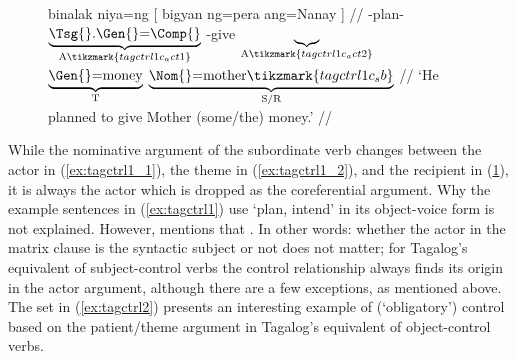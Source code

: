 \begin{figure}
\a\label{ex:tagctrl1_3}\begingl[aboveglbskip=1.5em, aboveglftskip=1.75em]
	\gla binalak niya=ng \textup{[} bigyan {} ng=pera ang=Nanay \textup{]} //
	\glb \Pfv{}-plan-\Ov{}
		$\underbrace{\text{\smash{\Tsg{}}.\Gen{}=\Comp{}}}_{\text{A}%
			\tikzmark{tagctrl1c_act1}%
		}$
		{}
		\Dv{}-give%
		$\underbrace{}_{\text{A}%
			\tikzmark{tagctrl1c_act2}%
		}$
		$\underbrace{\text{\Gen{}=\smash{money}}}_{\text{T}}$
		$\underbrace{\text{\Nom{}=mother}%
			\tikzmark{tagctrl1c_sb}%
		}_{\text{S/R}}$
		{} //
	\glft `He planned to give Mother (some/the) money.' //
\endgl
{}

\xe
\end{figure}

While the nominative argument of the subordinate verb changes between the actor
in (\ref{ex:tagctrl1_1}), the theme in (\ref{ex:tagctrl1_2}), and the recipient
in (\ref{ex:tagctrl1_3}), it is always the actor which is dropped as the
coreferential argument. Why the example sentences in (\ref{ex:tagctrl1}) use
 `plan, intend' in its object-voice form is not explained. However,
\citet{kroeger1991} mentions that . In other words: whether the actor in the
matrix clause is the syntactic subject or not does not matter; for Tagalog's
equivalent of subject-control verbs the control relationship always finds its
origin in the actor argument, although there are a few exceptions, as mentioned
above. The set in (\ref{ex:tagctrl2}) presents an interesting example of
(`obligatory') control based on the patient/theme argument in Tagalog's
equivalent of object-control verbs.

